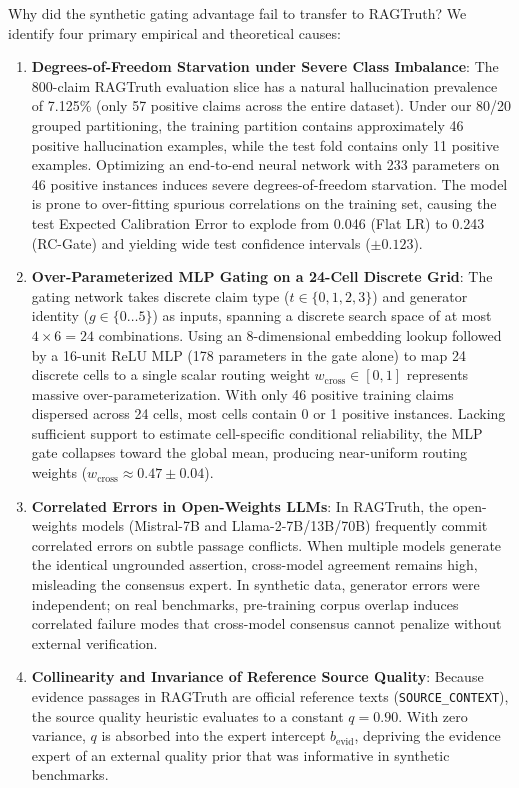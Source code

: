 \documentclass[pdflatex,sn-mathphys,Numbered]{sn-jnl}
\begin{document}
Why did the synthetic gating advantage fail to transfer to RAGTruth? We identify four primary empirical and theoretical causes:
\begin{enumerate}
    \item \textbf{Degrees-of-Freedom Starvation under Severe Class Imbalance}: The 800-claim RAGTruth evaluation slice has a natural hallucination prevalence of 7.125\% (only 57 positive claims across the entire dataset). Under our 80/20 grouped partitioning, the training partition contains approximately 46 positive hallucination examples, while the test fold contains only 11 positive examples. Optimizing an end-to-end neural network with 233 parameters on 46 positive instances induces severe degrees-of-freedom starvation. The model is prone to over-fitting spurious correlations on the training set, causing the test Expected Calibration Error to explode from 0.046 (Flat LR) to 0.243 (RC-Gate) and yielding wide test confidence intervals ($\pm 0.123$).
    \item \textbf{Over-Parameterized MLP Gating on a 24-Cell Discrete Grid}: The gating network takes discrete claim type ($t \in \{0,1,2,3\}$) and generator identity ($g \in \{0 \dots 5\}$) as inputs, spanning a discrete search space of at most $4 \times 6 = 24$ combinations. Using an 8-dimensional embedding lookup followed by a 16-unit ReLU MLP (178 parameters in the gate alone) to map 24 discrete cells to a single scalar routing weight $w_{\mathrm{cross}} \in [0, 1]$ represents massive over-parameterization. With only 46 positive training claims dispersed across 24 cells, most cells contain 0 or 1 positive instances. Lacking sufficient support to estimate cell-specific conditional reliability, the MLP gate collapses toward the global mean, producing near-uniform routing weights ($w_{\mathrm{cross}} \approx 0.47 \pm 0.04$).
    \item \textbf{Correlated Errors in Open-Weights LLMs}: In RAGTruth, the open-weights models (Mistral-7B and Llama-2-7B/13B/70B) frequently commit correlated errors on subtle passage conflicts. When multiple models generate the identical ungrounded assertion, cross-model agreement remains high, misleading the consensus expert. In synthetic data, generator errors were independent; on real benchmarks, pre-training corpus overlap induces correlated failure modes that cross-model consensus cannot penalize without external verification.
    \item \textbf{Collinearity and Invariance of Reference Source Quality}: Because evidence passages in RAGTruth are official reference texts (\texttt{SOURCE\_CONTEXT}), the source quality heuristic evaluates to a constant $q = 0.90$. With zero variance, $q$ is absorbed into the expert intercept $b_{\mathrm{evid}}$, depriving the evidence expert of an external quality prior that was informative in synthetic benchmarks.
\end{enumerate}
\end{document}
